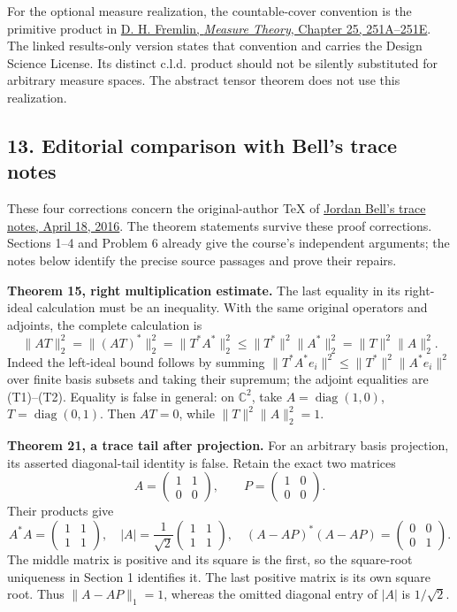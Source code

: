 \documentclass[
  11pt,
]{article}
\begin{document}
For the optional measure realization, the countable-cover convention is
the primitive product in
\href{https://www1.essex.ac.uk/maths/people/fremlin/chap25.ro.pdf}{D. H.
Fremlin, \emph{Measure Theory}, Chapter 25, 251A--251E}. The linked
results-only version states that convention and carries the Design
Science License. Its distinct c.l.d. product should not be silently
substituted for arbitrary measure spaces. The abstract tensor theorem
does not use this realization.

\subsection{13. Editorial comparison with Bell's trace
notes}\label{editorial-comparison-with-bells-trace-notes}

These four corrections concern the original-author TeX of
\href{https://jordanbell.info/LaTeX/mathematics/traceclass/traceclass.tex}{Jordan
Bell's trace notes, April 18, 2016}. The theorem statements survive
these proof corrections. Sections 1--4 and Problem 6 already give the
course's independent arguments; the notes below identify the precise
source passages and prove their repairs.

\textbf{Theorem 15, right multiplication estimate.} The last equality in
its right-ideal calculation must be an inequality. With the same
original operators and adjoints, the complete calculation is \[
 \|AT\|_2^2=\|(AT)^*\|_2^2=\|T^*A^*\|_2^2
 \leq\|T^*\|^2\|A^*\|_2^2=\|T\|^2\|A\|_2^2.
 \tag{BE1}
\] Indeed the left-ideal bound follows by summing
\(\|T^*A^*e_i\|^2\leq\|T^*\|^2\|A^*e_i\|^2\) over finite basis subsets
and taking their supremum; the adjoint equalities are (T1)--(T2).
Equality is false in general: on \(\mathbb C^2\), take
\(A=\operatorname{diag}(1,0)\), \(T=\operatorname{diag}(0,1)\). Then
\(AT=0\), while \(\|T\|^2\|A\|_2^2=1\).

\textbf{Theorem 21, a trace tail after projection.} For an arbitrary
basis projection, its asserted diagonal-tail identity is false. Retain
the exact two matrices \[
 A=\begin{pmatrix}1&1\\0&0\end{pmatrix},\qquad
 P=\begin{pmatrix}1&0\\0&0\end{pmatrix}.
 \tag{BE2}
\] Their products give \[
 A^*A=\begin{pmatrix}1&1\\1&1\end{pmatrix},\quad
 |A|=\frac1{\sqrt2}\begin{pmatrix}1&1\\1&1\end{pmatrix},\quad
 (A-AP)^*(A-AP)=\begin{pmatrix}0&0\\0&1\end{pmatrix}.
 \tag{BE3}
\] The middle matrix is positive and its square is the first, so the
square-root uniqueness in Section 1 identifies it. The last positive
matrix is its own square root. Thus \(\|A-AP\|_1=1\), whereas the
omitted diagonal entry of \(|A|\) is \(1/\sqrt2\).
\end{document}
